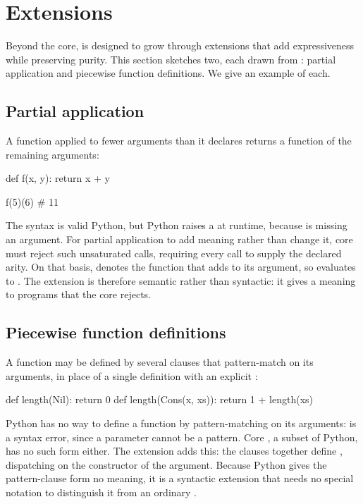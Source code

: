 \section{Extensions}
\label{sec:extensions}

Beyond the core, \PurePy is designed to grow through extensions that add expressiveness while preserving
purity. This section sketches two, each drawn from \Fluid: partial application and piecewise function
definitions. We give an example of each. 

\subsection{Partial application}
\label{sec:extension-partial-application}

A function applied to fewer arguments than it declares returns a function of the remaining arguments:

\begin{python}
def f(x, y):
    return x + y

f(5)(6)  # 11
\end{python}

\noindent The syntax is valid Python, but Python raises a  at runtime, because
 is missing an argument. For partial application to add meaning rather than change it, core
\PurePy must reject such unsaturated calls, requiring every call to supply the declared arity. On that basis,
 denotes the function that adds  to its argument, so  evaluates to
. The extension is therefore semantic rather than syntactic: it gives a meaning to programs that
the core rejects.

\subsection{Piecewise function definitions}
\label{sec:extension-piecewise}

A function may be defined by several clauses that pattern-match on its arguments, in place of a single
definition with an explicit :

\begin{python}
def length(Nil):
    return 0
def length(Cons(x, xs)):
    return 1 + length(xs)
\end{python}

\noindent Python has no way to define a function by pattern-matching on its arguments:  is a syntax error, since a parameter cannot be a pattern. Core \PurePy, a subset of
Python, has no such form either. The extension adds this: the clauses together define , dispatching on
the constructor of the argument. Because Python gives the pattern-clause form no meaning, it is a
syntactic extension that needs no special notation to distinguish it from an ordinary .

